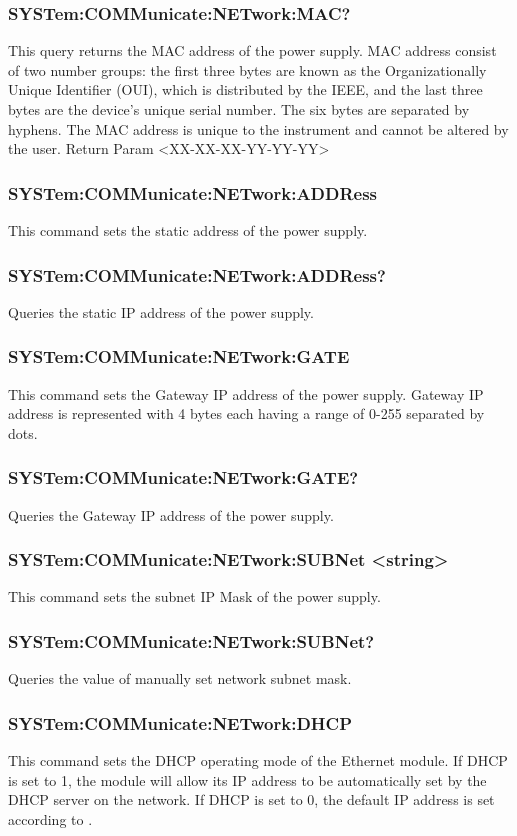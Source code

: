 \documentclass[a4paper,10pt]{article}
\begin{document}
        \subsubsection{SYSTem:COMMunicate:NETwork:MAC?}
                This query returns the MAC address of the power supply. MAC address consist of two number groups: the first three bytes are known as the Organizationally Unique Identifier (OUI), which is distributed by the IEEE, and the last three bytes are the device’s unique serial number. The six bytes are separated by hyphens. The MAC address is unique to the instrument and cannot be altered by the user.
                \newline
                Return Param <XX-XX-XX-YY-YY-YY>

		\subsubsection{SYSTem:COMMunicate:NETwork:ADDRess}
		        This command sets the static address of the power supply.
	    \subsubsection{SYSTem:COMMunicate:NETwork:ADDRess?}
		        Queries the static IP address of the power supply.
		\subsubsection{SYSTem:COMMunicate:NETwork:GATE}
		        This command sets the Gateway IP address of the power supply. Gateway IP address is represented with 4 bytes each having a range of 0-255 separated by dots.
		\subsubsection{SYSTem:COMMunicate:NETwork:GATE?}
		        Queries the Gateway IP address of the power supply.
	    \subsubsection{SYSTem:COMMunicate:NETwork:SUBNet <string>}
	            This command sets the subnet IP Mask of the power supply.
	    \subsubsection{SYSTem:COMMunicate:NETwork:SUBNet?}
		        Queries the value of manually set network subnet mask.
		\subsubsection{SYSTem:COMMunicate:NETwork:DHCP}
		        This command sets the DHCP operating mode of the Ethernet module. If DHCP is set to 1, the module will allow its IP address to be automatically set by the DHCP server on the network. If DHCP is set to 0, the default IP address is set according to .
\end{document}
